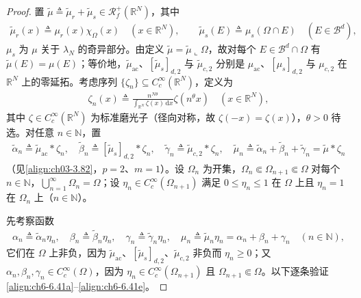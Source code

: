 \documentclass[../../main.tex]{subfiles}%
\begin{document}
\begin{proof}
置 $\widetilde\mu\triangleq\widetilde\mu_r+\widetilde\mu_s\in\mathscr{R}^+_f(\mathbb{R}^N)$，其中
\begin{align*}
\widetilde\mu_r(x)\triangleq\mu_r(x)\chi_\Omega(x)\quad(x\in\mathbb{R}^N),\qquad
\widetilde\mu_s(E)\triangleq\mu_s(\Omega\cap E)\quad(E\in\mathscr{B}^d),
\end{align*}
$\mu_s$ 为 $\mu$ 关于 $\lambda_N$ 的奇异部分。由定义 $\widetilde\mu=\widetilde\mu\llcorner\Omega$，故对每个 $E\in\mathscr{B}^d\cap\Omega$ 有 $\widetilde\mu(E)=\mu(E)$；等价地，$\widetilde\mu_{\mathrm{ac}}$、$[\widetilde\mu_s]_{d,2}$ 与 $\widetilde\mu_{c,2}$ 分别是 $\mu_{\mathrm{ac}}$、$[\mu_s]_{d,2}$ 与 $\mu_{c,2}$ 在 $\mathbb{R}^N$ 上的零延拓。考虑序列 $\{\zeta_n\}\subseteq C^\infty_c(\mathbb{R}^N)$，定义为
\begin{align}
\zeta_n(x)\triangleq\frac{n^{N\theta}}{\int_{\mathbb{R}^N}\zeta(x)\,\mathrm{d}x}\zeta(n^\theta x)\quad(x\in\mathbb{R}^N), \label{align:ch6-6.42}
\end{align}
其中 $\zeta\in C^\infty_c(\mathbb{R}^N)$ 为标准磨光子（径向对称，故 $\zeta(-x)=\zeta(x)$），$\theta>0$ 待选。对任意 $n\in\mathbb{N}$，置
\begin{align*}
\widetilde\alpha_n\triangleq\widetilde\mu_{\mathrm{ac}}*\zeta_n,\quad
\widetilde\beta_n\triangleq[\widetilde\mu_s]_{d,2}*\zeta_n,\quad
\widetilde\gamma_n\triangleq\widetilde\mu_{c,2}*\zeta_n,\quad
\widetilde\mu_n\triangleq\widetilde\alpha_n+\widetilde\beta_n+\widetilde\gamma_n=\widetilde\mu*\zeta_n
\end{align*}
（见\eqref{align:ch03-3.82}，$p=2$、$m=1$）。设 $\Omega_n$ 为开集，$\Omega_n\Subset\Omega_{n+1}\Subset\Omega$ 对每个 $n\in\mathbb{N}$，$\bigcup_{n=1}^\infty\Omega_n=\Omega$；设 $\eta_n\in C^\infty_c(\Omega_{n+1})$ 满足 $0\leqslant\eta_n\leqslant1$ 在 $\Omega$ 上且 $\eta_n=1$ 在 $\Omega_n$ 上（$n\in\mathbb{N}$）。

先考察函数
\begin{align*}
\alpha_n\triangleq\widetilde\alpha_n\eta_n,\quad
\beta_n\triangleq\widetilde\beta_n\eta_n,\quad
\gamma_n\triangleq\widetilde\gamma_n\eta_n,\quad
\mu_n\triangleq\widetilde\mu_n\eta_n=\alpha_n+\beta_n+\gamma_n\quad(n\in\mathbb{N}),
\end{align*}
它们在 $\Omega$ 上非负，因为 $\widetilde\mu_{\mathrm{ac}}$、$[\widetilde\mu_s]_{d,2}$、$\widetilde\mu_{c,2}$ 非负而 $\eta_n\geqslant0$；又 $\alpha_n,\beta_n,\gamma_n\in C^\infty_c(\Omega)$，因为 $\eta_n\in C^\infty_c(\Omega_{n+1})$ 且 $\Omega_{n+1}\Subset\Omega$。以下逐条验证\eqref{align:ch6-6.41a}--\eqref{align:ch6-6.41e}。


\end{proof}
\end{document}
